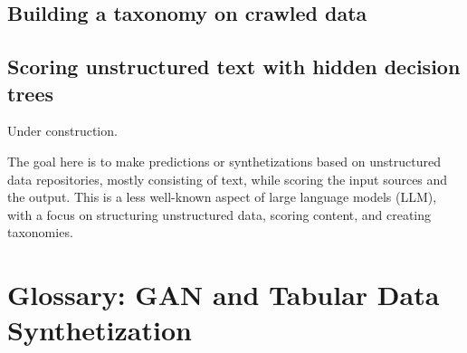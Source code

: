 \documentclass[oneside,10pt]{book}
\begin{document}

\section{Building a taxonomy on crawled data}


\section{Scoring unstructured text with hidden decision trees}

Under construction. %





The goal here is to make predictions or synthetizations based on unstructured data repositories, mostly consisting of text, while scoring the input sources and
 the output. This is a less well-known aspect of large language models (\textcolor{index}{LLM}), with a focus on structuring 
\textcolor{index}{unstructured data}, scoring content, and creating \textcolor{index}{taxonomies}.




\appendix
\chapter{Glossary: GAN and Tabular Data Synthetization}\label{aasdaaqw}
\end{document}
